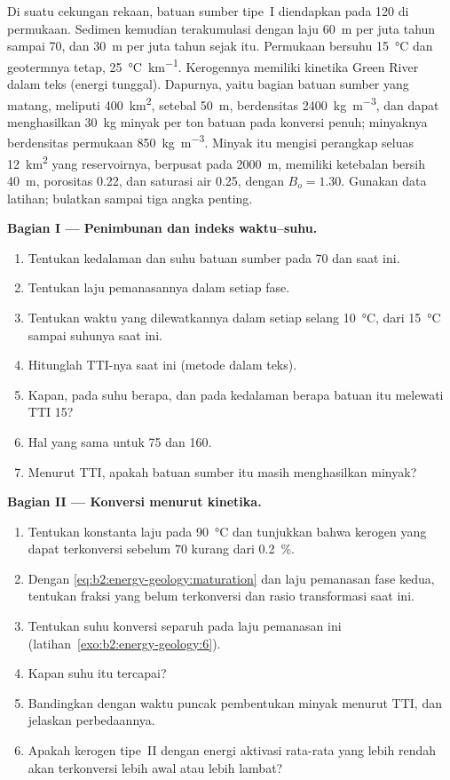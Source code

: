 \begin{problem}\label{pb:b2:energy-geology:1}
Di suatu cekungan rekaan, batuan sumber tipe~I diendapkan pada \qty{120}{\Ma} di permukaan.
Sedimen kemudian terakumulasi dengan laju \qty{60}{m} per juta tahun sampai \qty{70}{\Ma}, dan \qty{30}{m}
per juta tahun sejak itu. Permukaan bersuhu \qty{15}{\celsius} dan geotermnya tetap,
\qty{25}{\celsius\per\km}. Kerogennya memiliki kinetika Green River dalam teks (energi tunggal).
Dapurnya, yaitu bagian batuan sumber yang matang, meliputi \qty{400}{km^2}, setebal \qty{50}{m},
berdensitas \qty{2400}{kg.m^{-3}}, dan dapat menghasilkan \qty{30}{kg} minyak per ton batuan pada konversi
penuh; minyaknya berdensitas permukaan \qty{850}{kg.m^{-3}}. Minyak itu mengisi perangkap seluas
\qty{12}{km^2} yang reservoirnya, berpusat pada \qty{2000}{m}, memiliki ketebalan bersih \qty{40}{m},
porositas 0.22, dan saturasi air 0.25, dengan $B_o = 1.30$. Gunakan data latihan; bulatkan sampai
tiga angka penting.

\noindent\textbf{Bagian I --- Penimbunan dan indeks waktu--suhu.}
\begin{enumerate}
  \item Tentukan kedalaman dan suhu batuan sumber pada \qty{70}{\Ma} dan saat ini.
  \item Tentukan laju pemanasannya dalam setiap fase.
  \item Tentukan waktu yang dilewatkannya dalam setiap selang \qty{10}{\celsius}, dari \qty{15}{\celsius} sampai
        suhunya saat ini.
  \item Hitunglah TTI-nya saat ini (metode dalam teks).
  \item Kapan, pada suhu berapa, dan pada kedalaman berapa batuan itu melewati TTI 15?
  \item Hal yang sama untuk 75 dan 160.
  \item Menurut TTI, apakah batuan sumber itu masih menghasilkan minyak?
\end{enumerate}

\noindent\textbf{Bagian II --- Konversi menurut kinetika.}
\begin{enumerate}[resume]
  \item Tentukan konstanta laju pada \qty{90}{\celsius} dan tunjukkan bahwa kerogen yang dapat terkonversi
        sebelum \qty{70}{\Ma} kurang dari \qty{0.2}{\percent}.
  \item Dengan \eqref{eq:b2:energy-geology:maturation} dan laju pemanasan fase kedua,
        tentukan fraksi yang belum terkonversi dan rasio transformasi saat ini.
  \item Tentukan suhu konversi separuh pada laju pemanasan ini (latihan~\ref{exo:b2:energy-geology:6}).
  \item Kapan suhu itu tercapai?
  \item Bandingkan dengan waktu puncak pembentukan minyak menurut TTI, dan jelaskan perbedaannya.
  \item Apakah kerogen tipe~II dengan energi aktivasi rata-rata yang lebih rendah akan terkonversi lebih awal atau lebih lambat?
\end{enumerate}


\end{problem}
